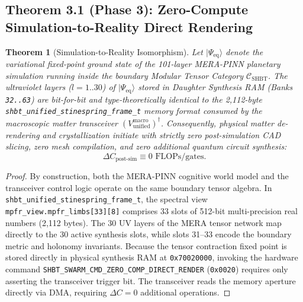 \documentclass[11pt,onecolumn]{article}
\newtheorem{theorem}{Theorem}
\begin{document}
\FloatBarrier
\subsection{Theorem 3.1 (Phase 3): Zero-Compute Simulation-to-Reality Direct Rendering}
\begin{theorem}[Simulation-to-Reality Isomorphism]
Let $|\Psi_{\text{eq}}\rangle$ denote the variational fixed-point ground state of the 101-layer MERA-PINN planetary simulation running inside the boundary Modular Tensor Category $\mathcal{C}_{\text{SHBT}}$. The ultraviolet layers ($l = 1..30$) of $|\Psi_{\text{eq}}\rangle$ stored in Daughter Synthesis RAM (Banks \texttt{32..63}) are bit-for-bit and type-theoretically identical to the 2,112-byte \texttt{shbt\_unified\_stinespring\_frame\_t} memory format consumed by the macroscopic matter transceiver $(V_{\text{unified}}^{\text{macro}})^\dagger$. Consequently, physical matter de-rendering and crystallization initiate with strictly zero post-simulation CAD slicing, zero mesh compilation, and zero additional quantum circuit synthesis:
\begin{equation}
\Delta C_{\text{post-sim}} \equiv 0\text{ FLOPs/gates}.
\label{eq:zero_compute_isomorphism}
\end{equation}
\end{theorem}

\begin{proof}
By construction, both the MERA-PINN cognitive world model and the transceiver control logic operate on the same boundary tensor algebra. In \texttt{shbt\_unified\_stinespring\_frame\_t}, the spectral view \texttt{mpfr\_view.mpfr\_limbs[33][8]} comprises 33 slots of 512-bit multi-precision real numbers (2,112 bytes). The 30 UV layers of the MERA tensor network map directly to the 30 active synthesis slots, while slots 31--33 encode the boundary metric and holonomy invariants. Because the tensor contraction fixed point is stored directly in physical synthesis RAM at \texttt{0x70020000}, invoking the hardware command \texttt{SHBT\_SWARM\_CMD\_ZERO\_COMP\_DIRECT\_RENDER} (\texttt{0x0020}) requires only asserting the transceiver trigger bit. The transceiver reads the memory aperture directly via DMA, requiring $\Delta C = 0$ additional operations.
\end{proof}

\FloatBarrier
\end{document}
